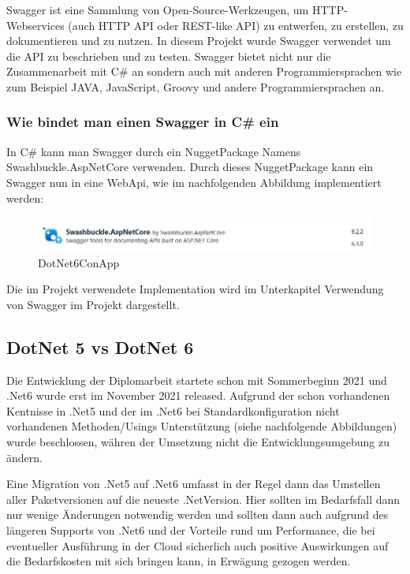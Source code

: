 Swagger ist eine Sammlung von Open-Source-Werkzeugen, um HTTP-Webservices (auch HTTP API oder REST-like API) zu entwerfen, zu erstellen, 
zu dokumentieren und zu nutzen.
In diesem Projekt wurde Swagger verwendet um die API zu beschrieben und zu testen.
Swagger bietet nicht nur die Zusammenarbeit mit C\# an sondern auch mit anderen Programmiersprachen wie zum Beispiel
JAVA, JavaScript, Groovy und andere Programmiersprachen an. 

\subsubsection*{Wie bindet man einen Swagger in C\# ein}
In C\# kann man Swagger durch ein NuggetPackage Namens Swashbuckle.AspNetCore verwenden.
Durch dieses NuggetPackage kann ein Swagger nun in eine WebApi, wie im nachfolgenden Abbildung implementiert werden:


\begin{figure}[H]
    \centering
    \includegraphics[width=1\textwidth]{./pics/SwaggerNuggetPackage.JPG}
    \caption{DotNet6ConApp}
\end{figure}


Die im Projekt verwendete Implementation wird im Unterkapitel Verwendung von Swagger im Projekt dargestellt.


\subsection {DotNet 5 vs DotNet 6}

Die Entwicklung der Diplomarbeit startete schon mit Sommerbeginn 2021 und .Net6 wurde erst im November 2021 released. 
Aufgrund der schon vorhandenen Kentnisse in .Net5 und der im .Net6 bei Standardkonfiguration nicht vorhandenen Methoden/Usings Unterstützung (siehe nachfolgende Abbildungen)
wurde beschlossen, währen der Umsetzung nicht die Entwicklungsumgebung zu ändern.

Eine Migration von .Net5 auf .Net6 umfasst in der Regel dann das Umstellen aller Paketversionen auf die neueste .NetVersion.
Hier sollten im Bedarfsfall dann nur wenige Änderungen notwendig werden und sollten dann auch aufgrund des längeren Supports von .Net6 
und der Vorteile rund um Performance, die bei eventueller Ausführung in der Cloud sicherlich auch positive Auswirkungen auf die 
Bedarfskosten mit sich bringen kann, in Erwägung gezogen werden.

